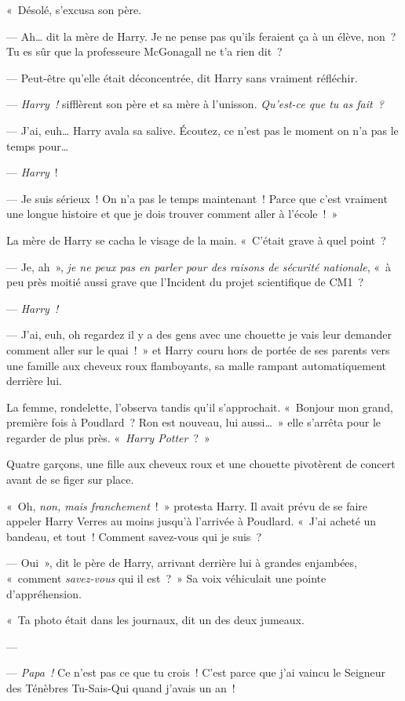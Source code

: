 «~Désolé, s'excusa son père.

--- Ah… dit la mère de Harry. Je ne pense pas qu'ils feraient ça à un élève, non~? Tu es sûr que la professeure McGonagall ne t'a rien dit~?

--- Peut-être qu'elle était déconcentrée, dit Harry sans vraiment réfléchir.

--- \emph{Harry~!} sifflèrent son père et sa mère à l'unisson. \emph{Qu'est-ce que tu as fait~?}

--- J'ai, euh… Harry avala sa salive. Écoutez, ce n'est pas le moment on n'a pas le temps pour…

--- \emph{Harry}~!

--- Je suis sérieux~! On n'a pas le temps maintenant~! Parce que c'est vraiment une longue histoire et que je dois trouver comment aller à l'école~!~»

La mère de Harry se cacha le visage de la main.
«~C'était grave à quel point~?

--- Je, ah~», \emph{je ne peux pas en parler pour des raisons de sécurité nationale}, «~à peu près moitié aussi grave que l'Incident du projet scientifique de CM1~?

--- \emph{Harry~!}

--- J'ai, euh, oh regardez il y a des gens avec une chouette je vais leur demander comment aller sur le quai~!~» et Harry couru hors de portée de ses parents vers une famille aux cheveux roux flamboyants, sa malle rampant automatiquement derrière lui.

La femme, rondelette, l'observa tandis qu'il s'approchait. «~Bonjour mon grand, première fois à Poudlard~? Ron est nouveau, lui aussi…~» elle s'arrêta pour le regarder de plus près. «~\emph{Harry Potter}~?~»

Quatre garçons, une fille aux cheveux roux et une chouette pivotèrent de concert avant de se figer sur place.

«~Oh, \emph{non, mais franchement}~!~» protesta Harry.
Il avait prévu de se faire appeler Harry Verres au moins jusqu'à l'arrivée à Poudlard.
«~J'ai acheté un bandeau, et tout~! Comment savez-vous qui je suis~?

--- Oui~», dit le père de Harry, arrivant derrière lui à grandes enjambées, «~comment \emph{savez-vous} qui il est~?~» Sa voix véhiculait une pointe d'appréhension.

«~Ta photo était dans les journaux, dit un des deux jumeaux.

--- 

--- \emph{Papa~!} Ce n'est pas ce que tu crois~! C'est parce que j'ai vaincu le Seigneur des Ténèbres Tu-Sais-Qui quand j'avais un an~!

